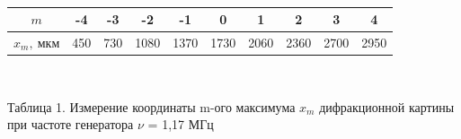 \documentclass[a4paper,12pt]{article}
\begin{document}
\


\begin{center}
\begin{tabular}{|c|c|c|c|c|c|c|c|c|c|}
	\hline
	$m$ &-4&-3&-2&-1&0&1&2&3&4\\
	\hline
	$x_m, \ \text{мкм}$ &450&730& 1080&1370&1730&2060&2360&2700&2950\\
	\hline
\end{tabular}

\


Таблица 1. Измерение координаты m-ого максимума $x_m$ дифракционной картины при частоте генератора $\nu$ = 1,17 МГц
\end{center}

\

\end{document}
